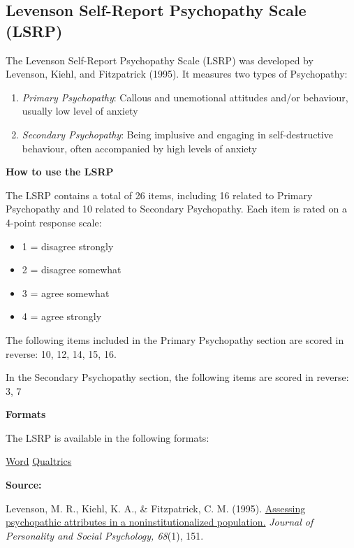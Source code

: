 \documentclass[
]{book}
\providecommand{\tightlist}{%
  \setlength{\itemsep}{0pt}\setlength{\parskip}{0pt}}
\begin{document}
\hypertarget{levenson-self-report-psychopathy-scale-lsrp}{%
\subsection{Levenson Self-Report Psychopathy Scale (LSRP)}\label{levenson-self-report-psychopathy-scale-lsrp}}

The Levenson Self-Report Psychopathy Scale (LSRP) was developed by Levenson, Kiehl, and Fitzpatrick (1995). It measures two types of Psychopathy:

\begin{enumerate}
\def\labelenumi{\arabic{enumi}.}
\tightlist
\item
  \emph{Primary Psychopathy}: Callous and unemotional attitudes and/or behaviour, usually low level of anxiety
\item
  \emph{Secondary Psychopathy}: Being implusive and engaging in self-destructive behaviour, often accompanied by high levels of anxiety
\end{enumerate}

\textbf{How to use the LSRP}

The LSRP contains a total of 26 items, including 16 related to Primary Psychopathy and 10 related to Secondary Psychopathy. Each item is rated on a 4-point response scale:

\begin{itemize}
\tightlist
\item
  1 = disagree strongly
\item
  2 = disagree somewhat
\item
  3 = agree somewhat
\item
  4 = agree strongly
\end{itemize}

The following items included in the Primary Psychopathy section are scored in reverse: 10, 12, 14, 15, 16.

In the Secondary Psychopathy section, the following items are scored in reverse: 3, 7

\textbf{Formats}

The LSRP is available in the following formats:

\href{link\%20to\%20file}{Word} \textbar{} \href{link\%20to\%20file}{Qualtrics}

\textbf{Source:}

Levenson, M. R., Kiehl, K. A., \& Fitzpatrick, C. M. (1995). \href{https://www.researchgate.net/profile/Michael_Levenson2/publication/15338539_Assessing_Psychopathic_Attributes_in_a_Noninstitutionalized_Population/links/54b6d8360cf2bd04be334b31.pdf}{Assessing psychopathic attributes in a noninstitutionalized population.} \emph{Journal of Personality and Social Psychology, 68}(1), 151.
\end{document}
